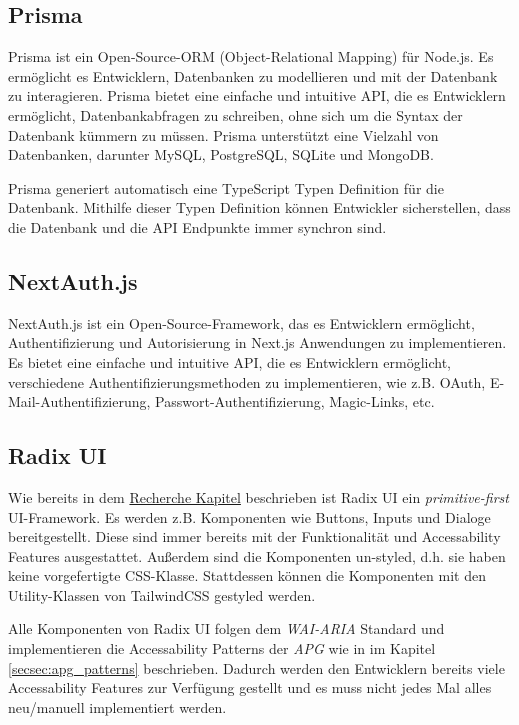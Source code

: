 \subsection{Prisma}

Prisma ist ein Open-Source-ORM (Object-Relational Mapping) für Node.js. Es ermöglicht es Entwicklern, Datenbanken zu modellieren und mit der Datenbank zu interagieren. Prisma bietet eine einfache und intuitive API, die es Entwicklern ermöglicht, Datenbankabfragen zu schreiben, ohne sich um die Syntax der Datenbank kümmern zu müssen. Prisma unterstützt eine Vielzahl von Datenbanken, darunter MySQL, PostgreSQL, SQLite und MongoDB.

Prisma generiert automatisch eine TypeScript Typen Definition für die Datenbank. Mithilfe dieser Typen Definition können Entwickler sicherstellen, dass die Datenbank und die API Endpunkte immer synchron sind.

\subsection{NextAuth.js}

NextAuth.js ist ein Open-Source-Framework, das es Entwicklern ermöglicht, Authentifizierung und Autorisierung in Next.js Anwendungen zu implementieren. Es bietet eine einfache und intuitive API, die es Entwicklern ermöglicht, verschiedene Authentifizierungsmethoden zu implementieren, wie z.B. OAuth, E-Mail-Authentifizierung, Passwort-Authentifizierung, Magic-Links, etc.

\subsection{Radix UI}

Wie bereits in dem \hyperref[secsec:radix]{Recherche Kapitel} beschrieben ist Radix UI ein \emph{primitive-first} UI-Framework. Es werden z.B. Komponenten wie Buttons, Inputs und Dialoge bereitgestellt. Diese sind immer bereits mit der Funktionalität und Accessability Features ausgestattet. Außerdem sind die Komponenten un-styled, d.h. sie haben keine vorgefertigte CSS-Klasse. Stattdessen können die Komponenten mit den Utility-Klassen von TailwindCSS gestyled werden.

Alle Komponenten von Radix UI folgen dem \emph{WAI-ARIA} Standard und implementieren die Accessability Patterns der \emph{APG} wie in im Kapitel \ref{secsec:apg_patterns} beschrieben. Dadurch werden den Entwicklern bereits viele Accessability Features zur Verfügung gestellt und es muss nicht jedes Mal alles neu/manuell implementiert werden.

